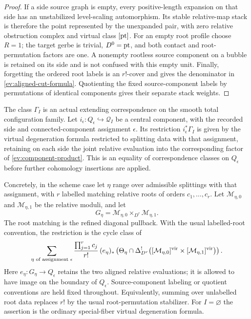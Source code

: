 \begin{proof}
If a side source graph is empty, every positive-length expansion on
that side has an unstabilized level-scaling automorphism.  Its stable
relative-map stack is therefore the point represented by the
unexpanded pair, with zero relative obstruction complex and virtual
class $[\mathrm{pt}]$.  For an empty root profile choose $R=1$; the target
gerbe is trivial, $D^0=\mathrm{pt}$, and both contact and root-permutation
factors are one.  A nonempty rootless source component on a bubble
is retained on its side and is not confused with this empty unit.
Finally, forgetting the ordered root labels is an $r!$-cover and
gives the denominator in \eqref{ev:aligned-cut-formula}.  Quotienting
the fixed source-component labels by permutations of identical
components gives their separate stack weights.
\end{proof}

\begin{proposition}
\label{ev:restriction}
The class $\Gamma_I$ is an actual extending correspondence on the
smooth total configuration family.  Let
$i_\epsilon:Q_\epsilon\hookrightarrow\mathcal Q_I$ be a central
component, with the recorded side and connected-component assignment
$\epsilon$.  Its restriction $i_\epsilon^*\Gamma_I$ is given by the
virtual degeneration formula restricted to splitting data with that
assignment, retaining on each side the joint relative evaluation
into the corresponding factor of \eqref{ev:component-product}.
This is an equality of correspondence classes on $Q_\epsilon$
before further cohomology insertions are applied.

Concretely, in the scheme case let $\eta$ range over admissible
splittings with that assignment, with $r$ labelled matching relative
roots of orders $c_1,\ldots,c_r$.  Let
$\mathcal M_{\eta,0}$ and $\mathcal M_{\eta,1}$ be the relative
moduli, and let
\[
  G_\eta=\mathcal M_{\eta,0}\times_{D^r}\mathcal M_{\eta,1}.
\]
The root matching is the refined diagonal pullback.  With the usual
labelled-root convention, the restriction is the cycle class of
\begin{equation}
\label{ev:restriction-formula}
 \sum_{\eta\text{ of assignment }\epsilon}
 \frac{\prod_{j=1}^r c_j}{r!}\,
 (e_\eta)_*
 \left(
   \Theta_\eta\cap
   \Delta_{D^r}^{!}
   \bigl([\mathcal M_{\eta,0}]^{\mathrm{vir}}
          \times[\mathcal M_{\eta,1}]^{\mathrm{vir}}\bigr)
 \right).
\end{equation}
Here $e_\eta:G_\eta\to Q_\epsilon$ retains the two aligned relative
evaluations; it is allowed to have image on the boundary of
$Q_\epsilon$.  Source-component labeling or quotient conventions are
held fixed throughout.  Equivalently, summing over unlabelled root
data replaces $r!$ by the usual root-permutation stabilizer.
For $I=\varnothing$ the assertion is the ordinary special-fiber
virtual degeneration formula.
\end{proposition}

